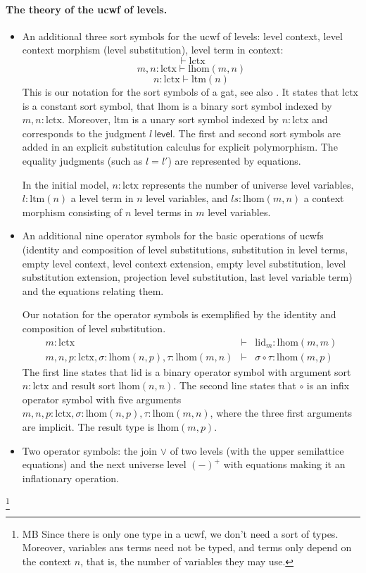 \documentclass[11pt,a4paper]{article}
\theoremstyle{definition}
\newcommand{\level}{\mathsf{level}}
\def\lhom{\mathrm{lhom}}
\def\lctx{\mathrm{lctx}}
\def\ltm{\mathrm{ltm}}
\def\lid{\mathrm{lid}}
\begin{document}
\paragraph{The theory of the ucwf of levels.}
\begin{itemize}
\item An additional three sort symbols for the ucwf of levels: level context, level context morphism (level substitution), level term in context:
$$
\vdash \lctx
$$
$$
m,n : \lctx \vdash \lhom(m,n)
$$
$$
n : \lctx \vdash  \ltm(n)
$$
This is our notation for the sort symbols of a gat, see also \cite{bezem:hofmann}. It states that $\lctx$ is a constant sort symbol, that $\lhom$ is a binary sort symbol indexed by $m,n : \lctx$. Moreover, $\ltm$ is a unary sort symbol indexed by $n : \lctx$ and corresponds to the judgment $l\ \level$. The first and second sort symbols are added in an explicit substitution calculus for explicit polymorphism. The equality judgments (such as $l = l'$) are represented by equations.  

In the initial model, $n : \lctx$ represents the number of universe level variables, $l : \ltm(n)$ a level term in $n$ level variables, and $ls : \lhom(m,n)$ a context morphism consisting of $n$ level terms in $m$ level variables.

\item An additional nine operator symbols for the basic operations of ucwfs (identity and composition of level substitutions, substitution in level terms, empty level context, level context extension, empty level substitution, level substitution extension, projection level substitution, last level variable term) and the equations relating them.

Our notation for the operator symbols is exemplified by the identity and composition of level substitution.
\begin{eqnarray*}
m : \lctx &\vdash& \lid_m : \lhom(m,m)\\
m, n, p : \lctx, \sigma : \lhom(n,p), \tau : \lhom(m,n) &\vdash&
\sigma \circ \tau : \lhom(m,p)
\end{eqnarray*}
The first line states that $\lid$ is a binary operator symbol with argument sort $n : \lctx$ and result sort $\lhom(n,n)$. The second line states that $\circ$ is an infix operator symbol with five arguments $m,n,p : \lctx, \sigma : \lhom(n,p), \tau : \lhom(m,n)$, where the three first arguments are implicit. The result type is $\lhom(m,p)$.

\item Two operator symbols: the join $\vee$ of two levels (with the upper semilattice equations) and the next universe level $(-)^+$ with equations making it an inflationary operation.
\end{itemize}
%
\footnote{MB Since there is only one type in a ucwf, we don't need
a sort of types. Moreover, variables ans terms need not be typed, and
terms only depend on the context $n$, that is, the number of variables
they may use.}
\end{document}
